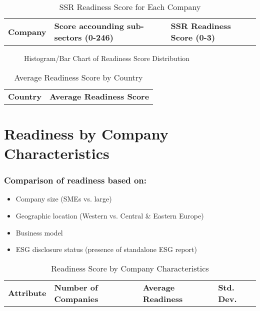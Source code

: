 \begin{table}[H]
    \centering
    \caption{SSR Readiness Score for Each Company}
    \begin{tabular}{l l l}
        \textbf{Company} & \textbf{Score accounding sub-sectors (0-246)} & \textbf{SSR Readiness Score (0-3)} \\
    \end{tabular}
\end{table}

\begin{figure}[H]
    \centering
    \caption{Histogram/Bar Chart of Readiness Score Distribution}
\end{figure}

\begin{table}[H]
    \centering
    \caption{Average Readiness Score by Country}
    \begin{tabular}{l l}
        \textbf{Country} & \textbf{Average Readiness Score} \\
    \end{tabular}
\end{table}

\section{Readiness by Company Characteristics}
\subsubsection{Comparison of readiness based on:}
\begin{itemize}
    \item Company size (SMEs vs. large)
    \item Geographic location (Western vs. Central \& Eastern Europe)
    \item Business model
    \item ESG disclosure status (presence of standalone ESG report)
\end{itemize}

\begin{table}[H]
    \centering
    \caption{Readiness Score by Company Characteristics}
    \begin{tabular}{l l l l}
        \textbf{Attribute} & \textbf{Number of Companies} & \textbf{Average Readiness} & \textbf{Std. Dev.} \\
    \end{tabular}
\end{table}

